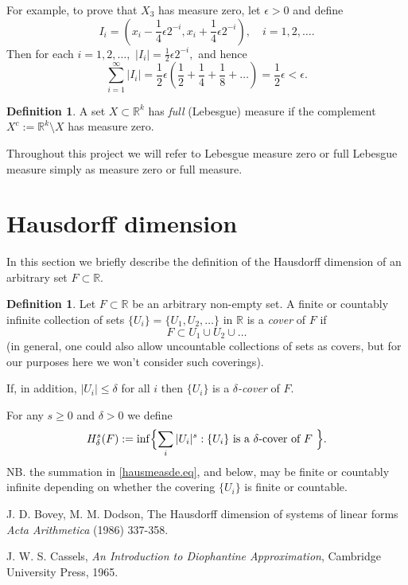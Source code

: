 \documentclass[reqno,openany,12pt]{amsbook}
\theoremstyle{definition}
\newtheorem{definition}[thm]{Definition}
\theoremstyle{remark}
\newcommand\de{\delta}
\newcommand\ep{\epsilon}
\newcommand\R{\mathbb{R}}
\begin{document}
For example, to prove that $X_3$ has measure zero, let $\ep>0$ and
define
$$
I_i = (x_i - \frac14 \ep 2^{-i}, x_i + \frac14 \ep 2^{-i}), \quad i=1,2,\dots .
$$
Then for each $i=1,2,\dots,$
$
|I_{i}| = \frac12 \ep 2^{-i},
$
and hence
$$
\sum_{i=1}^\infty |I_{i}| = \frac12 \ep \left(\frac12 + \frac14 +
\frac18 +\dots \right) = \frac12 \ep < \ep .
$$

\begin{definition}
A set $X \subset \R^k$ has  {\em full} (Lebesgue) measure if the
complement $X^c := \R^k  \setminus X$ has  measure zero.
\end{definition}

Throughout this project we will refer to Lebesgue measure zero or
full Lebesgue measure simply as measure zero or full measure.


\section{Hausdorff dimension}

In this section we briefly describe the definition of the
Hausdorff dimension of an arbitrary set $F \subset \R$.


\begin{definition}
Let $F \subset \R$ be an arbitrary non-empty set.
A finite or countably infinite collection of
sets $\{ U_i \} = \{ U_1,U_2,\dots\}$ in $\R$ is a {\em cover} of $F$ if
$$
F \subset U_1 \cup U_2 \cup \dots
$$
(in general, one could also allow uncountable collections of sets as covers,
but for our purposes here we won't consider such coverings).

If, in addition,  $|U_i| \le \de$ for all $i$ then $\{ U_i \}$ is a {\em $\de$-cover}
of $F$.
\end{definition}

For any $s \ge 0$ and $\de >0$ we define
\begin{equation}  \label{hausmeasde.eq}
H_\de^s(F) := \inf \Bigl\{ \sum_i |U_i|^s :
\text{$\{U_i\}$ is a $\de$-cover of $F$ }\Bigr\} .
\end{equation}
NB. the summation in \eqref{hausmeasde.eq}, and below, may be finite or
countably infinite depending on whether the covering $\{U_i\}$ is finite
or countable.


\begin{thebibliography}{99}

J. D. Bovey, M. M. Dodson,
The Hausdorff dimension of systems of linear forms
{\em Acta Arithmetica}
(1986) 337-358.

J. W. S. Cassels,
{\em An Introduction to Diophantine Approximation},
Cambridge University Press, 1965.



\end{thebibliography}
\end{document}
